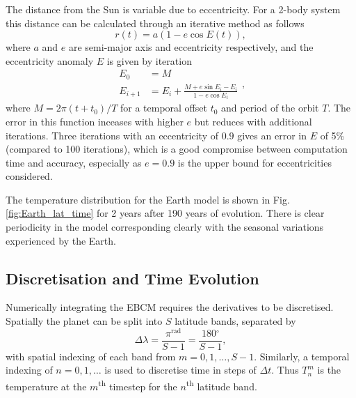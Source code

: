\documentclass[12pt, onecolumn]{revtex4-2}    %
\newcommand{\radians}{\ensuremath{^{\text{rad}}}}
\newcommand{\degrees}{\ensuremath{^{\circ}}}
\begin{document}
The distance from the Sun is variable due to eccentricity.
For a 2-body system this distance can be calculated through an iterative method as follows
\begin{equation}
  r(t) = a (1 - e \cos E(t)), 
  \label{eq:two_body_distance}
\end{equation}
where $a$ and $e$ are semi-major axis and eccentricity respectively, and the eccentricity anomaly $E$ is given by iteration
\begin{equation}
  \begin{split}
    E_0 &= M \\
    E_{i+1} &= E_i + \frac{M + e \sin E_i - E_i}{1-e \cos E_i}
  \end{split},
  \label{eq:two_body_angle}
\end{equation}
where $M = 2\pi (t + t_0) / T$ for a temporal offset $t_0$ and period of the orbit $T$.
The error in this function inceases with higher $e$ but reduces with additional iterations.
Three iterations with an eccentricity of $0.9$ gives an error in $E$ of 5\% (compared to 100 iterations), which is a good compromise between computation time and accuracy, especially as $e=0.9$ is the upper bound for eccentricities considered.

The temperature distribution for the Earth model is shown in Fig. \ref{fig:Earth_lat_time} for 2 years after 190 years of evolution.
There is clear periodicity in the model corresponding clearly with the seasonal variations experienced by the Earth.

\subsection{Discretisation and Time Evolution} \label{ssec:DiscretisationPDE}
%
Numerically integrating the EBCM requires the derivatives to be discretised.
Spatially the planet can be split into $S$ latitude bands, separated by
\begin{equation}
  \Delta\lambda = \frac{\pi\radians}{S-1} = \frac{180\degrees}{S-1},
  \label{eq:latitude_step}
\end{equation}
with spatial indexing of each band from $m=0, 1, \dots, S-1$.
Similarly, a temporal indexing of $n=0, 1, \dots$ is used to discretise time in steps of $\Delta t$.
Thus $T^m_n$ is the temperature at the $m$\textsuperscript{th} timestep for the $n$\textsuperscript{th} latitude band.
\end{document}
